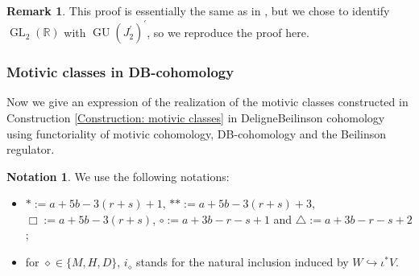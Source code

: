\documentclass[11pt, a4paper]{amsart}
\theoremstyle{plain}
\theoremstyle{definition}
\newtheorem{remark}[theorem]{Remark}
\newtheorem{notation}[theorem]{Notation}
\numberwithin{equation}{section}
\def\RR{\mathbb{R}}
\DeclareMathOperator{\GU}{GU}
\DeclareMathOperator{\GL}{\mathrm{GL}}
\begin{document}
\begin{remark}
    This proof is essentially the same as in \cite[\S 6.3]{Kings98}, but we chose to identify $\GL_{2}(\RR)$ with $\GU(J_2^{\prime})^{\prime}$, so we reproduce the proof here. 
\end{remark}

\subsubsection{Motivic classes in DB-cohomology}
Now we give an expression of the realization of the motivic classes constructed in Construction \ref{Construction: motivic classes} in Deligne{\textendash}Beilinson cohomology using functoriality of motivic cohomology, DB-cohomology and the Beilinson regulator. 

\begin{notation}
    We use the following notations: 
    \begin{itemize}
        \item $* := a + 5b - 3 (r + s) + 1$, $** :=  a + 5b - 3 (r + s) + 3$, $\Box := a + 5b - 3 (r + s)$, $\circ := a + 3b -r - s + 1$ and $\triangle := a + 3b -r - s + 2$; 
        \item for $\diamond \in \{M, H, D\}$, $i_{\diamond}$ stands for the natural inclusion induced by $W \hookrightarrow \iota^{*}V$.
    \end{itemize}
\end{notation}
\end{document}
